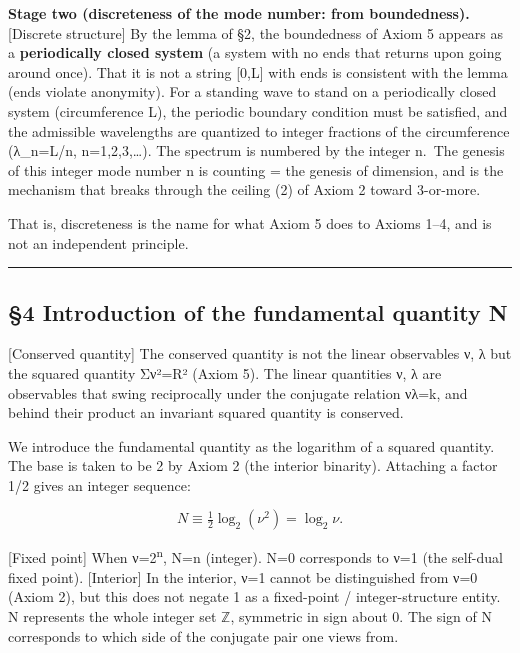 \documentclass[11pt]{ltjsarticle}
\begin{document}
\textbf{Stage two (discreteness of the mode number: from boundedness).}
{[}Discrete structure{]} By the lemma of §2, the boundedness of Axiom 5
appears as a \textbf{periodically closed system} (a system with no ends
that returns upon going around once). That it is not a string {[}0,L{]}
with ends is consistent with the lemma (ends violate anonymity). For a
standing wave to stand on a periodically closed system (circumference
L), the periodic boundary condition must be satisfied, and the
admissible wavelengths are quantized to integer fractions of the
circumference (λ\_n=L/n, n=1,2,3,\ldots). The spectrum is numbered by
the integer n.~The genesis of this integer mode number n is counting =
the genesis of dimension, and is the mechanism that breaks through the
ceiling (2) of Axiom 2 toward 3-or-more.

That is, discreteness is the name for what Axiom 5 does to Axioms 1--4,
and is not an independent principle.

\begin{center}\rule{0.5\linewidth}{0.5pt}\end{center}

\subsection{§4 Introduction of the fundamental quantity
N}\label{introduction-of-the-fundamental-quantity-n}

{[}Conserved quantity{]} The conserved quantity is not the linear
observables ν, λ but the squared quantity Σν²=R² (Axiom 5). The linear
quantities ν, λ are observables that swing reciprocally under the
conjugate relation νλ=k, and behind their product an invariant squared
quantity is conserved.

We introduce the fundamental quantity as the logarithm of a squared
quantity. The base is taken to be 2 by Axiom 2 (the interior binarity).
Attaching a factor 1/2 gives an integer sequence:

\[N \equiv \tfrac{1}{2}\log_2(\nu^2) = \log_2\nu .\]

{[}Fixed point{]} When ν=2\textsuperscript{n}, N=n (integer). N=0 corresponds to ν=1 (the
self-dual fixed point). {[}Interior{]} In the interior, ν=1 cannot be
distinguished from ν=0 (Axiom 2), but this does not negate 1 as a
fixed-point / integer-structure entity. N represents the whole integer
set $\mathbb{Z}$, symmetric in sign about 0. The sign of N corresponds to which
side of the conjugate pair one views from.
\end{document}
